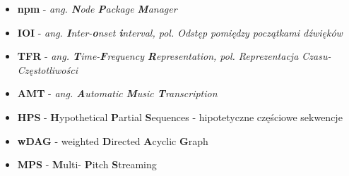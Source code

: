 \documentclass[12pt,a4paper,twoside]{mwart}
\begin{document}
\begin{itemize}
  \item \textbf{npm} - \textit{ang. \textbf{N}ode \textbf{P}ackage \textbf{M}anager}
  \item \textbf{IOI} - \textit{ang. \textbf{I}nter-\textbf{o}nset \textbf{i}nterval, pol. Odstęp pomiędzy początkami dźwięków}
  \item \textbf{TFR} - \textit{ang. \textbf{T}ime-\textbf{F}requency \textbf{R}epresentation, pol. Reprezentacja Czasu-Częstotliwości}
  \item \textbf{AMT} - \textit{ang. \textbf{A}utomatic \textbf{M}usic \textbf{T}ranscription}
  \item \textbf{HPS} - \textbf{H}ypothetical \textbf{P}artial \textbf{S}equences - hipotetyczne częściowe sekwencje
  \item \textbf{wDAG} - weighted \textbf{D}irected \textbf{A}cyclic \textbf{G}raph
  \item \textbf{MPS} - \textbf{M}ulti- \textbf{P}itch \textbf{S}treaming

\end{itemize}
\newpage

\printbibliography
\end{document}
